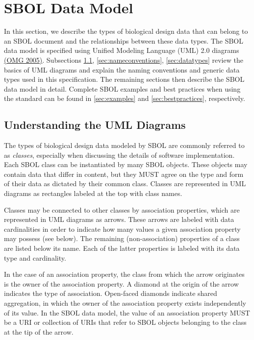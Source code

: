 \section{SBOL Data Model}\label{sec:model}

In this section, we describe the types of biological design data that can belong to an SBOL document and the relationships between these data types. The SBOL data model is specified using Unified Modeling Language (UML) 2.0 diagrams \href{http://www.omg.org/spec/UML/2.0/}{(OMG 2005)}. Subsections \ref{sec:umldiagrams}, \ref{sec:nameconventions}, \ref{sec:datatypes} review the basics of UML diagrams and explain the naming conventions and generic data types used in this specification. The remaining sections then describe the SBOL data model in detail. Complete SBOL examples and best practices when using the standard can be found in \ref{sec:examples} and \ref{sec:bestpractices}, respectively. 

\subsection{Understanding the UML Diagrams}
\label{sec:umldiagrams}

The types of biological design data modeled by SBOL are commonly referred to as {\em classes}, especially when discussing the details of software implementation. Each SBOL class can be instantiated by many SBOL objects. These objects may contain data that differ in content, but they MUST agree on the type and form of their data as dictated by their common class. Classes are represented in UML diagrams as rectangles labeled at the top with class names.

Classes may be connected to other classes by association properties, which are represented in UML diagrams as arrows. These arrows are labeled with data cardinalities in order to indicate how many values a given association property may possess (see below). The remaining (non-association) properties of a class are listed below its name. Each of the latter properties is labeled with its data type and cardinality.

In the case of an association property, the class from which the arrow originates is the owner of the association property. A diamond at the origin of the arrow indicates the type of association. Open-faced diamonds indicate shared aggregation, in which the owner of the association property exists independently of its value. In the SBOL data model, the value of an association property MUST be a URI or collection of URIs that refer to SBOL objects belonging to the class at the tip of the arrow.

